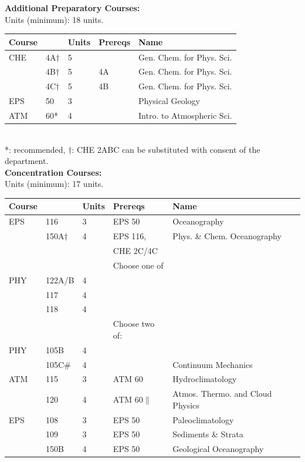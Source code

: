 \documentclass[12pt]{article}
\begin{document}

\newpage
{}
\vskip 0.25cm
\noindent
{\bf Additional Preparatory Courses:  }\\
Units (minimum):  18 units.\\
\begin{tabular}{|lllll|}
\hline
Course & & Units & Prereqs & Name \\
\hline
CHE & 4A$\dagger$ & 5 &        & Gen. Chem. for Phys. Sci.\\
    & 4B$\dagger$ & 5 & 4A & Gen. Chem. for Phys. Sci.\\
    & 4C$\dagger$ & 5 & 4B & Gen. Chem. for Phys. Sci.\\
EPS & 50          & 3 & & Physical Geology \\
ATM & 60*         & 4 & & Intro. to Atmospheric Sci. \\
\hline
\end{tabular}\\
\noindent
*: recommended, $\dagger$: CHE 2ABC can be substituted with consent of the department.\\
\vskip 0.25cm
\noindent
{\bf Concentration Courses:  }\\
Units (minimum):  17 units.\\
\begin{tabular}{|lllll|}
\hline
Course & & Units & Prereqs & Name \\
\hline
EPS & 116     & 3 & EPS 50      & Oceanography\\
    & 150A$\dagger$ & 4 & EPS 116,   & Phys. \& Chem. Oceanography\\
    &          &   & CHE 2C/4C   & \\
\hline
\hline
    & & & Choose one of & \\
\hline
PHY & 122A/B & 4 & & \\
    & 117    & 4 & & \\
    & 118    & 4 & & \\
\hline
\hline
    & & & Choose two of: & \\
\hline
PHY & 105B      & 4 &        & \\
    & 105C$\#$  & 4 &        & Continuum Mechanics \\
ATM & 115       & 3 & ATM 60 & Hydroclimatology \\
    & 120       & 4 & ATM 60$\parallel$ & Atmos. Thermo. and Cloud Physics \\
EPS & 108       & 3 & EPS 50 & Paleoclimatology\\
    & 109       & 3 & EPS 50 & Sediments \& Strata\\
    & 150B      & 4 & EPS 50 & Geological Oceanography\\
\hline
\end{tabular}\\
\end{document}

